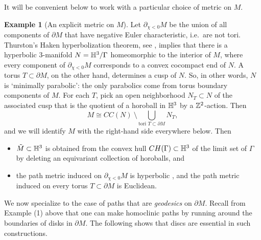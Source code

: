 \documentclass[12pt]{amsart}
\theoremstyle{definition}
\newtheorem{example}[theorem]{Example}
\theoremstyle{remark}
\begin{document}
It will be convenient  below to work with a  particular choice of metric on $M$.  

\begin{example}[An explicit metric on $M$]\label{explicitmetric}
Let $\partial_{\chi<0} M$  be the union of all  components of $\partial M$  that have negative Euler characteristic, i.e.\ are not tori. Thurston's Haken hyperbolization theorem, see \cite {Kapovichhyperbolic}, implies that  there is a hyperbolic $3$-manifold $N = \mathbb H^3 / \Gamma$ homeomorphic to the interior of $M$, where every component of $\partial_{\chi<0} M$  corresponds to a convex cocompact end of $N$. A torus $T \subset \partial M$, on the other hand, determines a cusp of $N$. So, in other words, $N$ is `minimally parabolic': the only parabolics come from torus boundary components of $M$. For each $T$, pick an open neighborhood $N_T \subset N$ of the associated cusp   that is the quotient of a horoball in $\mathbb H^3$ by a $\mathbb Z^2$-action. Then 
\begin{equation}
		M \cong CC(N) \ \setminus \bigcup_{\text {tori } T\subset \partial M} N_T, \label{ident}
\end{equation}
and we will  identify $M$  with the right-hand side everywhere below. Then
\begin{itemize}
	\item $\tilde M \subset \mathbb H^3$ is obtained from the convex hull $CH(\Gamma) \subset \mathbb H^3 $ of the limit set of $\Gamma$ by deleting an equivariant collection of horoballs, and
\item the path metric induced on $\partial_{\chi<0} M $ is   hyperbolic \cite [Proposition 8.5.1]{Thurstongeometry},  and the  path metric induced on every torus $T \subset\partial M$  is Euclidean. 
\end{itemize} 
\end{example}



 We now specialize to the case of paths that are \emph{geodesics} on  $\partial M $.  Recall  from Example (1) above that one can make homoclinic paths by running around the boundaries of disks in $\partial M$. The following shows that discs are essential in such constructions.
\end{document}
